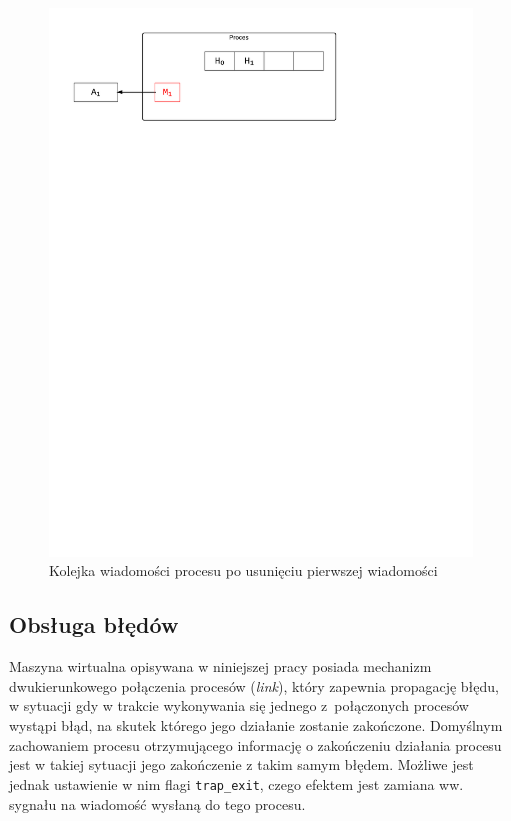 \begin{figure}[h]
\centerline{\includegraphics[scale=0.75, clip, trim=10mm 220mm 68mm 10mm]{mp4}}
\caption{Kolejka wiadomości procesu po usunięciu pierwszej wiadomości}
\label{fig:mp4}
\end{figure}

\subsection{Obsługa błędów}
\label{sub:procBledy}

Maszyna wirtualna opisywana w niniejszej pracy posiada mechanizm dwukierunkowego połączenia procesów (\emph{link}), który zapewnia propagację błędu, w sytuacji gdy w trakcie wykonywania się jednego z~połączonych procesów wystąpi błąd, na skutek którego jego działanie zostanie zakończone.
Domyślnym zachowaniem procesu otrzymującego informację o zakończeniu działania procesu jest w takiej sytuacji jego zakończenie z takim samym błędem.
Możliwe jest jednak ustawienie w nim flagi \texttt{trap\_exit}, czego efektem jest zamiana ww. sygnału na wiadomość wysłaną do tego procesu.

